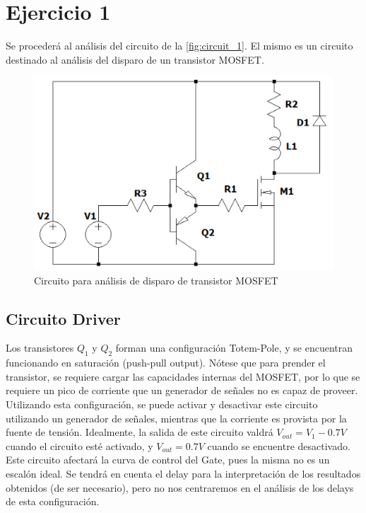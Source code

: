 \documentclass[e4_tp1_main.tex]{subfiles}
\begin{document}
\section{Ejercicio 1}
Se procederá al análisis del circuito de la \autoref{fig:circuit_1}. El mismo es un circuito destinado al análisis del disparo de un transistor MOSFET.


\begin{figure}[H]
  \centering
  \includegraphics[width=\linewidth/2]{images/ej1/circuit_1.png}
  \caption{Circuito para análisis de disparo de transistor MOSFET}
  \label{fig:circuit_1}
\end{figure}

\subsection{Circuito Driver}

Los transistores $Q_1$ y $Q_2$ forman una configuración Totem-Pole, y se encuentran funcionando en saturación (push-pull output). 
Nótese que para prender el transistor, se requiere cargar las capacidades internas del MOSFET, por lo que se requiere un pico de corriente que un generador de señales no es capaz de proveer. Utilizando esta configuración, se puede activar y desactivar este circuito utilizando un generador de señales, mientras que la corriente es provista por la fuente de tensión.
Idealmente, la salida de este circuito valdrá $V_{out} = V_1 - 0.7V$ cuando el circuito esté activado, y $V_{out} = 0.7V$ cuando se encuentre desactivado. Este circuito afectará la curva de control del Gate, pues la misma no es un escalón ideal. Se tendrá en cuenta el delay para la interpretación de los resultados obtenidos (de ser necesario), pero no nos centraremos en el análisis de los delays de esta configuración.
\end{document}

